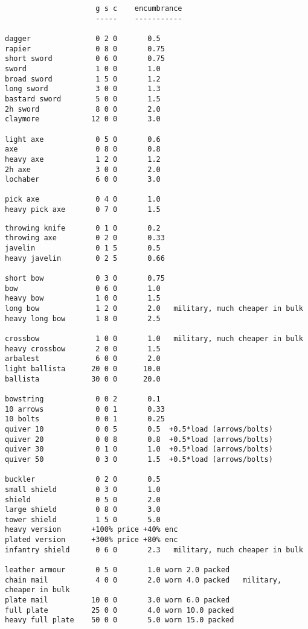 \small \begin{verbatim}
                     g s c    encumbrance
                     -----    -----------

dagger               0 2 0       0.5
rapier               0 8 0       0.75
short sword          0 6 0       0.75
sword                1 0 0       1.0
broad sword          1 5 0       1.2
long sword           3 0 0       1.3
bastard sword        5 0 0       1.5
2h sword             8 0 0       2.0
claymore            12 0 0       3.0

light axe            0 5 0       0.6
axe                  0 8 0       0.8
heavy axe            1 2 0       1.2
2h axe               3 0 0       2.0
lochaber             6 0 0       3.0

pick axe             0 4 0       1.0
heavy pick axe       0 7 0       1.5

\end{verbatim} \pagebreak[1] \begin{verbatim}
throwing knife       0 1 0       0.2
throwing axe         0 2 0       0.33
javelin              0 1 5       0.5
heavy javelin        0 2 5       0.66

short bow            0 3 0       0.75
bow                  0 6 0       1.0
heavy bow            1 0 0       1.5
long bow             1 2 0       2.0   military, much cheaper in bulk
heavy long bow       1 8 0       2.5

crossbow             1 0 0       1.0   military, much cheaper in bulk
heavy crossbow       2 0 0       1.5
arbalest             6 0 0       2.0
light ballista      20 0 0      10.0
ballista            30 0 0      20.0

bowstring            0 0 2       0.1
10 arrows            0 0 1       0.33
10 bolts             0 0 1       0.25
quiver 10            0 0 5       0.5  +0.5*load (arrows/bolts)
quiver 20            0 0 8       0.8  +0.5*load (arrows/bolts)
quiver 30            0 1 0       1.0  +0.5*load (arrows/bolts)
quiver 50            0 3 0       1.5  +0.5*load (arrows/bolts)

buckler              0 2 0       0.5
small shield         0 3 0       1.0
shield               0 5 0       2.0
large shield         0 8 0       3.0
tower shield         1 5 0       5.0
heavy version       +100% price +40% enc
plated version      +300% price +80% enc
infantry shield      0 6 0       2.3   military, much cheaper in bulk

leather armour       0 5 0       1.0 worn 2.0 packed
chain mail           4 0 0       2.0 worn 4.0 packed   military, cheaper in bulk
plate mail          10 0 0       3.0 worn 6.0 packed
full plate          25 0 0       4.0 worn 10.0 packed
heavy full plate    50 0 0       5.0 worn 15.0 packed
\end{verbatim} \normalsize
\goodbreak





